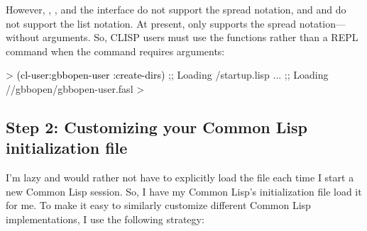 \documentclass[10pt,twoside,english,pdftex]{article}
\begin{document}
However, ,
, and the
 interface do not
support the spread notation, and 
and  do not support the list
notation.  At present,  only supports
the spread notation---without arguments.  So, CLISP users must use the
 functions rather than a REPL command when the command
requires arguments:
%
\begin{example}\color{darkergray}%
  > \textcolor{black}{(cl-user:gbbopen-user :create-dirs)}
  ;; Loading /startup.lisp
     ...
  ;; Loading //gbbopen/gbbopen-user.fasl
  >
\end{example}

\subsection*{Step 2: Customizing your Common Lisp initialization file}

I'm lazy and would rather not have to explicitly load the
 file each time I start a new Common Lisp session.
So, I have my Common Lisp's initialization file load it for me.  To make it
easy to similarly customize different Common Lisp implementations, I use the
following strategy:
\end{document}
